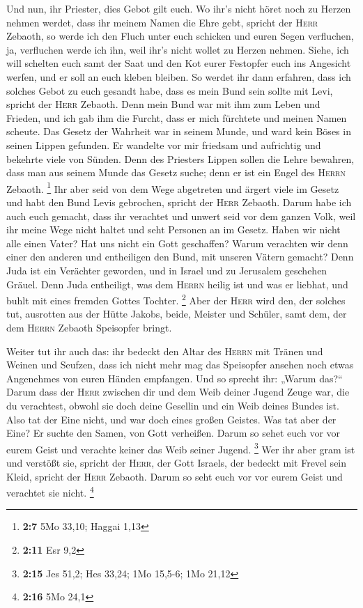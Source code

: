  Und nun, ihr Priester, dies Gebot gilt euch.
 Wo ihr's nicht höret noch zu Herzen nehmen werdet, dass
ihr meinem Namen die Ehre gebt, spricht der \textsc{Herr} Zebaoth, so
werde ich den Fluch unter euch schicken und euren Segen verfluchen, ja,
verfluchen werde ich ihn, weil ihr's nicht wollet zu Herzen nehmen.
 Siehe, ich will schelten euch samt der Saat und den Kot
eurer Festopfer euch ins Angesicht werfen, und er soll an euch kleben
bleiben.  So werdet ihr dann erfahren, dass ich solches
Gebot zu euch gesandt habe, dass es mein Bund sein sollte mit Levi,
spricht der \textsc{Herr} Zebaoth.  Denn mein Bund war mit
ihm zum Leben und Frieden, und ich gab ihm die Furcht, dass er mich
fürchtete und meinen Namen scheute.  Das Gesetz der
Wahrheit war in seinem Munde, und ward kein Böses in seinen Lippen
gefunden. Er wandelte vor mir friedsam und aufrichtig und bekehrte viele
von Sünden.  Denn des Priesters Lippen sollen die Lehre
bewahren, dass man aus seinem Munde das Gesetz suche; denn er ist ein
Engel des \textsc{Herrn} Zebaoth. \footnote{\textbf{2:7} 5Mo 33,10;
  Haggai 1,13}  Ihr aber seid von dem Wege abgetreten und
ärgert viele im Gesetz und habt den Bund Levis gebrochen, spricht der
\textsc{Herr} Zebaoth.  Darum habe ich auch euch gemacht,
dass ihr verachtet und unwert seid vor dem ganzen Volk, weil ihr meine
Wege nicht haltet und seht Personen an im Gesetz.  Haben
wir nicht alle einen Vater? Hat uns nicht ein Gott geschaffen? Warum
verachten wir denn einer den anderen und entheiligen den Bund, mit
unseren Vätern gemacht?  Denn Juda ist ein Verächter
geworden, und in Israel und zu Jerusalem geschehen Gräuel. Denn Juda
entheiligt, was dem \textsc{Herrn} heilig ist und was er liebhat, und
buhlt mit eines fremden Gottes Tochter. \footnote{\textbf{2:11} Esr 9,2}
 Aber der \textsc{Herr} wird den, der solches tut,
ausrotten aus der Hütte Jakobs, beide, Meister und Schüler, samt dem,
der dem \textsc{Herrn} Zebaoth Speisopfer bringt.

 Weiter tut ihr auch das: ihr bedeckt den Altar des
\textsc{Herrn} mit Tränen und Weinen und Seufzen, dass ich nicht mehr
mag das Speisopfer ansehen noch etwas Angenehmes von euren Händen
empfangen.  Und so sprecht ihr: „Warum das?{}`` Darum
dass der \textsc{Herr} zwischen dir und dem Weib deiner Jugend Zeuge
war, die du verachtest, obwohl sie doch deine Gesellin und ein Weib
deines Bundes ist.  Also tat der Eine nicht, und war doch
eines großen Geistes. Was tat aber der Eine? Er suchte den Samen, von
Gott verheißen. Darum so sehet euch vor vor eurem Geist und verachte
keiner das Weib seiner Jugend. \footnote{\textbf{2:15} Jes 51,2; Hes
  33,24; 1Mo 15,5-6; 1Mo 21,12}  Wer ihr aber gram ist
und verstößt sie, spricht der \textsc{Herr}, der Gott Israels, der
bedeckt mit Frevel sein Kleid, spricht der \textsc{Herr} Zebaoth. Darum
so seht euch vor vor eurem Geist und verachtet sie nicht. \footnote{\textbf{2:16}
  5Mo 24,1}

